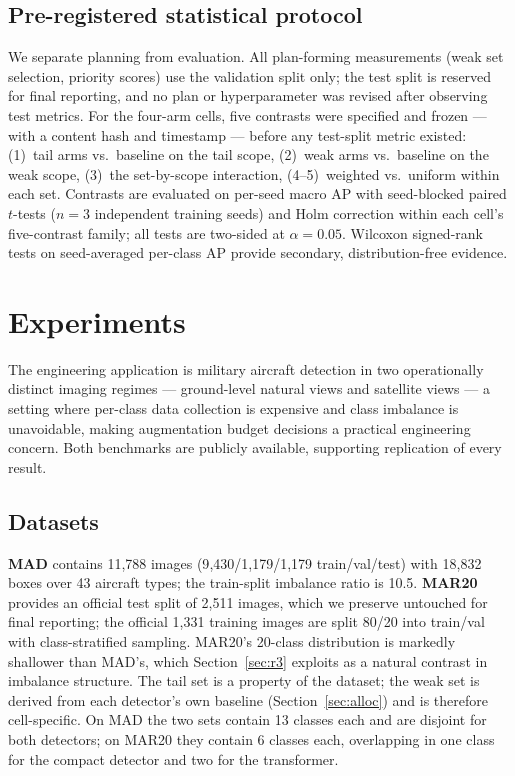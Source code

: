 \documentclass[preprint,12pt,authoryear]{elsarticle}
\begin{document}
\subsection{Pre-registered statistical protocol}\label{sec:stats}

We separate planning from evaluation. All plan-forming measurements
(weak set selection, priority scores) use the validation split only; the
test split is reserved for final reporting, and no plan or
hyperparameter was revised after observing test metrics. For the
four-arm cells, five contrasts were specified and frozen --- with
a content hash and timestamp --- before any test-split metric existed:
(1)~tail arms vs.\ baseline on the tail scope, (2)~weak arms vs.\
baseline on the weak scope, (3)~the set-by-scope interaction,
(4--5)~weighted vs.\ uniform within each set. Contrasts are evaluated on
per-seed macro AP with seed-blocked paired $t$-tests ($n = 3$
independent training seeds) and Holm correction \citep{holm1979simple}
within each cell's five-contrast family; all tests are two-sided at
$\alpha = 0.05$. Wilcoxon signed-rank tests on seed-averaged per-class
AP provide secondary, distribution-free evidence.

\section{Experiments}\label{sec:exp}

The engineering application is military aircraft detection in two
operationally distinct imaging regimes --- ground-level natural views
and satellite views --- a setting where per-class data collection is
expensive and class imbalance is unavoidable, making augmentation budget
decisions a practical engineering concern. Both benchmarks are publicly
available, supporting replication of every result.

\subsection{Datasets}
\textbf{MAD} \citep[Military Aircraft Detection, natural side/ground
views; public;][]{rookieengg2023mad} contains 11{,}788 images
(9{,}430/1{,}179/1{,}179 train/val/test) with 18{,}832 boxes over 43
aircraft types; the train-split imbalance ratio is 10.5. \textbf{MAR20}
\citep[Military Aircraft Recognition dataset, satellite view, horizontal
boxes; public;][]{yu2023mar20} provides an official test split of
2{,}511 images, which we preserve untouched for final reporting; the
official 1{,}331 training images are split 80/20 into train/val with
class-stratified sampling. MAR20's 20-class distribution is markedly
shallower than MAD's, which Section~\ref{sec:r3} exploits as a natural
contrast in imbalance structure. The tail set is a property of the
dataset; the weak set is derived from each detector's own baseline
(Section~\ref{sec:alloc}) and is therefore cell-specific. On MAD the two
sets contain 13 classes each and are disjoint for both detectors; on
MAR20 they contain 6 classes each, overlapping in one class for the
compact detector and two for the transformer.
\end{document}
